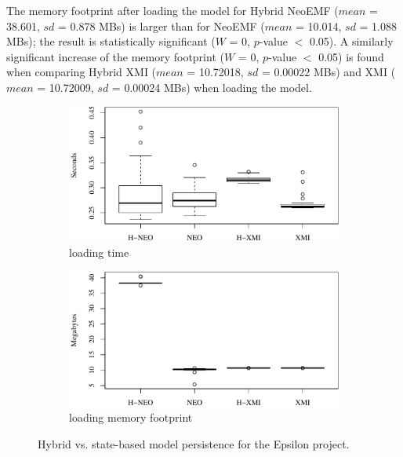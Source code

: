 \documentclass{llncs}
\begin{document}
The memory footprint after loading the model for Hybrid NeoEMF ($mean$ = 38.601, $sd$ = 0.878 MBs) is larger than for NeoEMF ($mean$ = 10.014, $sd$ = 1.088 MBs); the result is statistically significant ($W$ = 0, $p$-value $<$ 0.05). A similarly significant increase of the memory footprint ($W$ = 0, $p$-value $<$ 0.05) is found when comparing Hybrid XMI ($mean$ = 10.72018, $sd$ = 0.00022 MBs) and XMI ($mean$ = 10.72009, $sd$ = 0.00024 MBs) when loading the model. 

\begin{figure}[ht]
    \begin{subfigure}{0.49\linewidth}
        \includegraphics[width=\linewidth]{images/load_time_epsilon}
        \caption{loading time}
        \label{fig:load_time_epsilon}
    \end{subfigure}
    \begin{subfigure}{0.49\linewidth}
        \includegraphics[width=\linewidth]{images/load_memory_epsilon}
        \caption{loading memory footprint}
        \label{fig:load_memory_epsilon}
    \end{subfigure}
\caption{Hybrid vs. state-based model persistence for the Epsilon project.}
\end{figure}
\end{document}
